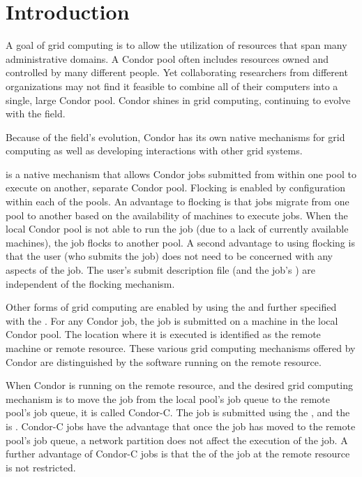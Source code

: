 \section{\label{sec:grids-intro}Introduction}

A goal of grid computing is to allow the utilization of resources that
span many administrative domains.
A Condor pool often includes
resources owned and controlled by many different people.
Yet collaborating researchers from different organizations
may not find it feasible to combine all of their computers
into a single, large Condor pool.
Condor shines in grid computing,
continuing to evolve with the field.

Because of the field's evolution, Condor has its own native mechanisms
for grid computing as well as developing interactions 
with other grid systems.


 is a native mechanism that allows Condor jobs
submitted from within one pool
to execute on another, separate Condor pool.
Flocking is enabled by configuration within each of the pools.
An advantage to flocking is that jobs migrate from one
pool to another based on the availability of machines to
execute jobs.
When the local Condor pool is not able to run the job
(due to a lack of currently available machines),
the job flocks to another pool.
A second advantage to using flocking is that the user
(who submits the job) does not need to be concerned with
any aspects of the job.
The user's submit description file (and the job's )
are independent of the flocking mechanism.

Other forms of grid computing are enabled by using
the  
and further specified with the .
For any Condor job, 
the job is submitted on a machine in the local Condor pool.
The location where it is executed is identified as the remote machine
or remote resource.
These various grid computing mechanisms offered by
Condor are distinguished by the software
running on the remote resource.

When Condor is running on the remote resource,
and the desired grid computing mechanism 
is to move the job from the local pool's job queue
to the remote pool's job queue,
it is called Condor-C.
The job is submitted using the 
, 
and the  is .
Condor-C jobs have the advantage that once the job has moved
to the remote pool's job queue,
a network partition does not affect the execution of the job.
A further advantage of Condor-C jobs is that the 
of the job at the remote resource is not restricted. 

